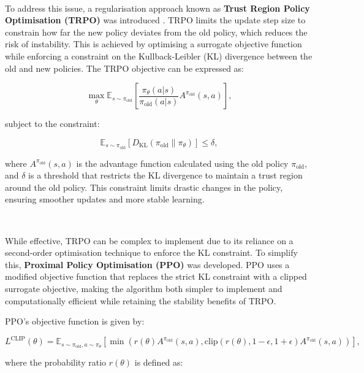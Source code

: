 \documentclass{article}
\begin{document}
\

To address this issue, a regularisation approach known as \textbf{Trust Region Policy Optimisation (TRPO)} was introduced \citep{schulman2015trust}. TRPO limits the update step size to constrain how far the new policy deviates from the old policy, which reduces the risk of instability. This is achieved by optimising a surrogate objective function while enforcing a constraint on the Kullback-Leibler (KL) divergence between the old and new policies. The TRPO objective can be expressed as:

\begin{equation}
\max_\theta \mathbb{E}_{s \sim \pi_\text{old}} \left[ \frac{\pi_\theta(a|s)}{\pi_\text{old}(a|s)} A^{\pi_\text{old}}(s, a) \right],
\end{equation}

subject to the constraint:

\begin{equation}
\mathbb{E}_{s \sim \pi_\text{old}} \left[ D_\text{KL}(\pi_\text{old} \| \pi_\theta) \right] \leq \delta,
\end{equation}

where $A^{\pi_\text{old}}(s, a)$ is the advantage function calculated using the old policy $\pi_\text{old}$, and $\delta$ is a threshold that restricts the KL divergence to maintain a trust region around the old policy. This constraint limits drastic changes in the policy, ensuring smoother updates and more stable learning.

\

While effective, TRPO can be complex to implement due to its reliance on a second-order optimisation technique to enforce the KL constraint. To simplify this, \textbf{Proximal Policy Optimisation (PPO)} \citep{schulman2017proximal} was developed. PPO uses a modified objective function that replaces the strict KL constraint with a clipped surrogate objective, making the algorithm both simpler to implement and computationally efficient while retaining the stability benefits of TRPO.

PPO’s objective function is given by:

\begin{equation}
L^{\text{CLIP}}(\theta) = \mathbb{E}_{s \sim \pi_\text{old}, a \sim \pi_\theta} \left[ \min \left( r(\theta) A^{\pi_\text{old}}(s, a), \text{clip}(r(\theta), 1 - \epsilon, 1 + \epsilon) A^{\pi_\text{old}}(s, a) \right) \right],
\end{equation}

where the probability ratio $r(\theta)$ is defined as:
\end{document}

